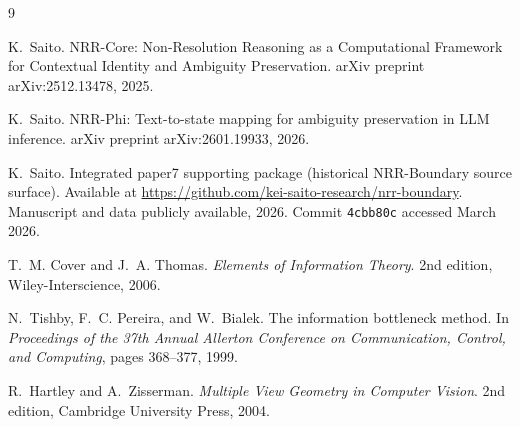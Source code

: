 \documentclass[11pt,a4paper]{article}
\begin{document}
\begin{thebibliography}{9}

K.~Saito.
\newblock NRR-Core: Non-Resolution Reasoning as a Computational Framework for Contextual Identity and Ambiguity Preservation.
\newblock arXiv preprint arXiv:2512.13478, 2025.

K.~Saito.
\newblock NRR-Phi: Text-to-state mapping for ambiguity preservation in LLM inference.
\newblock arXiv preprint arXiv:2601.19933, 2026.

K.~Saito.
\newblock Integrated paper7 supporting package (historical NRR-Boundary source surface).
\newblock Available at \url{https://github.com/kei-saito-research/nrr-boundary}. Manuscript and data publicly available, 2026. Commit \texttt{4cbb80c} accessed March 2026.

T.~M. Cover and J.~A. Thomas.
\newblock \emph{Elements of Information Theory}.
\newblock 2nd edition, Wiley-Interscience, 2006.

N.~Tishby, F.~C. Pereira, and W.~Bialek.
\newblock The information bottleneck method.
\newblock In \emph{Proceedings of the 37th Annual Allerton Conference on Communication, Control, and Computing}, pages 368--377, 1999.

R.~Hartley and A.~Zisserman.
\newblock \emph{Multiple View Geometry in Computer Vision}.
\newblock 2nd edition, Cambridge University Press, 2004.

\end{thebibliography}
\end{document}
